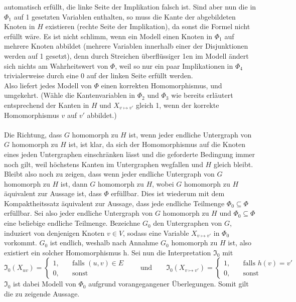 \documentclass[11pt, a4paper]{article}
\begin{document}
\begin{adjustwidth}{20pt}{20pt}
automatisch erfüllt, die linke Seite der Implikation falsch ist. Sind aber nun die in $\Phi_1$ auf 1 gesetzten Variablen enthalten, so muss die Kante der abgebildeten Knoten in
$H$ existieren (rechte Seite der Implikation), da sonst die Formel nicht erfüllt wäre. Es ist nicht schlimm, wenn ein Modell einen Knoten in $\Phi_1$ auf mehrere Knoten abbildet (mehrere
Variablen innerhalb einer der Disjunktionen werden auf 1 gesetzt), denn durch Streichen überflüssiger 1en im Modell ändert sich nichts am Wahrheitswert von $\Phi$, weil
so nur ein paar Implikationen in $\Phi_4$ trivialerweise durch eine 0 auf der linken Seite erfüllt werden.\\
Also liefert jedes Modell von $\Phi$ einen korrekten Homomorphismus, und umgekehrt. (Wähle die Kantenvariablen in $\Phi_2$ und $\Phi_3$ wie bereits erläutert entsprechend
der Kanten in $H$ und $X_{v\mapsto v'}$ gleich 1, wenn der korrekte Homomorphismus $v$ auf $v'$ abbildet.)\\ \ \\
Die Richtung, dass $G$ homomorph zu $H$ ist, wenn jeder endliche Untergraph von $G$ homomorph zu $H$ ist, ist klar, da sich der Homomorphismus auf die Knoten eines jeden
Untergraphen einschränken lässt und die geforderte Bedingung immer noch gilt, weil höchstens Kanten im Untergraphen wegfallen und $H$ gleich bleibt.\\
Bleibt also noch zu zeigen, dass wenn jeder endliche Untergraph von $G$ homomorph zu $H$ ist, dann $G$ homomorph zu $H$, wobei $G$ homomorph zu $H$ äquivalent zur Aussage
ist, dass $\Phi$ erfüllbar. Dies ist wiederum mit dem Kompaktheitssatz äquivalent zur Aussage, dass jede endliche Teilmenge $\Phi_0 \subseteq \Phi$ erfüllbar. Sei also jeder endliche
Untergraph von $G$ homomorph zu $H$ und $\Phi_0 \subseteq \Phi$ eine beliebige endliche Teilmenge. Bezeichne $G_0$ den Untergraphen von $G$, induziert von denjenigen Knoten
$v \in V$, sodass eine Variable $X_{v\mapsto v'}$ in $\Phi_0$ vorkommt. $G_0$ ist endlich, weshalb nach Annahme $G_0$ homomorph zu $H$ ist, also existiert ein solcher Homomorphismus h.
Sei nun die Interpretation $\mathfrak{I_0}$ mit 
\[
	\mathfrak{I_0}(X_{uv})=
		\begin{cases}
		1, &\quad \text{falls } (u,v) \in E\\
		0, &\quad \text{sonst}
		\end{cases}
	\qquad \text{und} \qquad
	\mathfrak{I_0}(X_{v\mapsto v'})=
		\begin{cases}
		1, &\quad \text{falls } h(v)=v'\\
		0, &\quad \text{sonst}
		\end{cases}
\]
$\mathfrak{I_0}$ ist dabei Modell von $\Phi_0$ aufgrund vorangegangener Überlegungen. Somit gilt die zu zeigende Aussage.

\end{adjustwidth}
\end{document}
